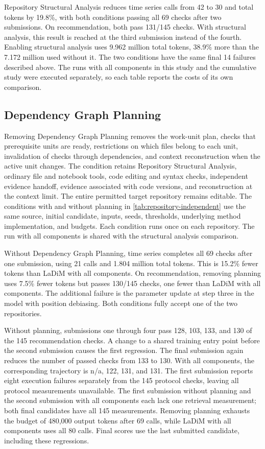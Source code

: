 \documentclass{article}
\begin{document}
Repository Structural Analysis reduces time series calls from 42 to 30 and total tokens by 19.8\%, with both conditions passing all 69 checks after two submissions. On recommendation, both pass 131/145 checks. With structural analysis, this result is reached at the third submission instead of the fourth. Enabling structural analysis uses 9.962 million total tokens, 38.9\% more than the 7.172 million used without it. The two conditions have the same final 14 failures described above. The runs with all components in this study and the cumulative study were executed separately, so each table reports the costs of its own comparison.

\subsection{Dependency Graph Planning}
Removing Dependency Graph Planning removes the work-unit plan, checks that prerequisite units are ready, restrictions on which files belong to each unit, invalidation of checks through dependencies, and context reconstruction when the active unit changes. The condition retains Repository Structural Analysis, ordinary file and notebook tools, code editing and syntax checks, independent evidence handoff, evidence associated with code versions, and reconstruction at the context limit. The entire permitted target repository remains editable. The conditions with and without planning in \cref{tab:repository-independent} use the same source, initial candidate, inputs, seeds, thresholds, underlying method implementation, and budgets. Each condition runs once on each repository. The run with all components is shared with the structural analysis comparison.

Without Dependency Graph Planning, time series completes all 69 checks after one submission, using 21 calls and 1.804 million total tokens. This is 15.2\% fewer tokens than LaDiM with all components. On recommendation, removing planning uses 7.5\% fewer tokens but passes 130/145 checks, one fewer than LaDiM with all components. The additional failure is the parameter update at step three in the model with position debiasing. Both conditions fully accept one of the two repositories.

Without planning, submissions one through four pass 128, 103, 133, and 130 of the 145 recommendation checks. A change to a shared training entry point before the second submission causes the first regression. The final submission again reduces the number of passed checks from 133 to 130. With all components, the corresponding trajectory is n/a, 122, 131, and 131. The first submission reports eight execution failures separately from the 145 protocol checks, leaving all protocol measurements unavailable. The first submission without planning and the second submission with all components each lack one retrieval measurement; both final candidates have all 145 measurements. Removing planning exhausts the budget of 480,000 output tokens after 69 calls, while LaDiM with all components uses all 80 calls. Final scores use the last submitted candidate, including these regressions.
\end{document}
